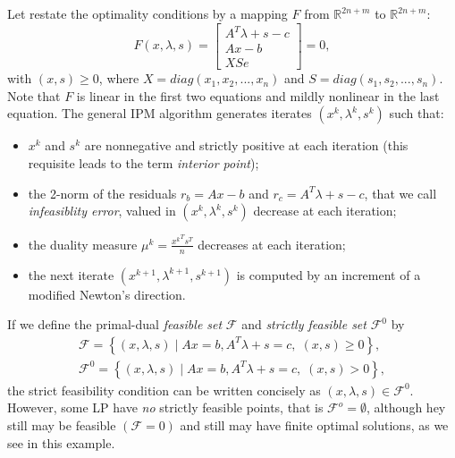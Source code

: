 \documentclass[a4paper,10 pt,titlepage,twoside]{book}
\theoremstyle{plain}
\theoremstyle{definition}
\theoremstyle{remark}
\begin{document}
 Let restate the optimality conditions by a mapping $\mathit{F}$ from $\mathbb{R}^{2n+m}$ to $\mathbb{R}^{2n+m}$:
\begin{equation}\label{F}
	\mathit{F}(x,\lambda,s)= \begin{bmatrix}
	A^{T}\lambda+s-c \\Ax-b \\XSe
	\end{bmatrix}=0,
\end{equation}
with $(x,s)\geq0$, where $X = diag(x_{1}, x_{2},...,x_{n})$ and $S = diag(s_{1}, s_{2},...,s_{n})$.\\
Note that $\mathit{F}$ is linear in the first two equations and mildly nonlinear in the last equation. 
The general IPM algorithm generates iterates $(x^{k},\lambda^{k},s^{k})$ such that:
\begin{itemize}
	\item $x^{k}$ and $s^{k}$ are nonnegative and strictly positive at each iteration (this requisite leads to the term \textit{interior point});
	\item the 2-norm of the residuals $r_{b} = Ax - b$ and $r_{c} =A^{T}\lambda +s - c$, that we call \textit{infeasiblity error}, valued in $(x^{k},\lambda^{k},s^{k})$ decrease at each iteration;
	\item the duality measure $\mu^{k} = \frac{{x^{k}}^{T}s^{T}}{n}$ decreases at each iteration;
	\item the next iterate $(x^{k+1},\lambda^{k+1},s^{k+1})$ is computed by an increment of a modified Newton's direction.
\end{itemize}
If we define the primal-dual \textit{feasible set} $\mathcal{F}$ and \textit{strictly feasible set} $\mathcal{F}^{0}$ by
\begin{align*}
\mathcal{F} = \left\lbrace(x,\lambda,s)\;|\;Ax = b, A^{T}\lambda+s =c,\;(x,s)\geq0\right\rbrace, \\
\mathcal{F}^{0} = \left\lbrace(x,\lambda,s)\;|\;Ax = b, A^{T}\lambda+s =c,\;(x,s)>0\right\rbrace, 
\end{align*}
the strict feasibility condition can be written concisely as $(x,\lambda,s)\in\mathcal{F}^{0}$.\\
However, some LP have \textit{no} strictly feasible points, that is $\mathcal{F}^{o}=\emptyset$, although hey still may be feasible $(\mathcal{F}=0)$ and still may have finite optimal solutions, as we see in this example.
\end{document}
